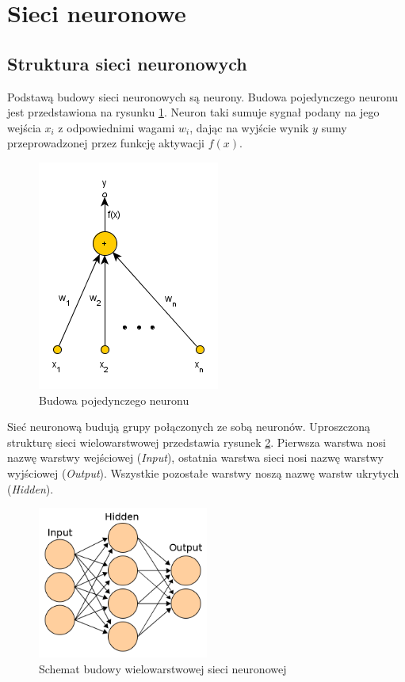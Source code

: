 \newpage
\section{Sieci neuronowe} 

\subsection{Struktura sieci neuronowych}
Podstawą budowy sieci neuronowych są neurony. Budowa pojedynczego neuronu jest przedstawiona na rysunku \ref{fig:neuron}. Neuron taki sumuje sygnał podany na jego wejścia $x_i$ z odpowiednimi wagami $w_i$, dając na wyjście wynik $y$ sumy przeprowadzonej przez funkcję aktywacji $f(x)$.
\begin{figure}[ht!]
	\centering
	\includegraphics[scale=0.8]{images/single_neuron.png}
	\caption{Budowa pojedynczego neuronu}
	\label{fig:neuron}
\end{figure}

Sieć neuronową budują grupy połączonych ze sobą neuronów. Uproszczoną strukturę sieci wielowarstwowej przedstawia rysunek \ref{fig:multilayer}. Pierwsza warstwa nosi nazwę warstwy wejściowej (\textit{Input}), ostatnia warstwa sieci nosi nazwę warstwy wyjściowej (\textit{Output}). Wszystkie pozostałe warstwy noszą nazwę warstw ukrytych (\textit{Hidden}).

\begin{figure}
	\centering
	\includegraphics[width=0.5\textwidth]{images/560px-Artificial_neural_network.png}
	\caption{Schemat budowy wielowarstwowej sieci neuronowej}
	\label{fig:multilayer}
\end{figure}


